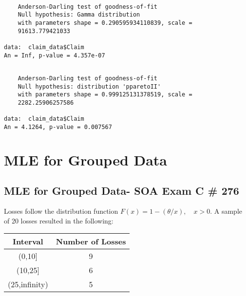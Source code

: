 \documentclass[]{book}
\newenvironment{Shaded}{\begin{snugshade}}{\end{snugshade}}
\newcommand{\KeywordTok}[1]{\textcolor[rgb]{0.13,0.29,0.53}{\textbf{#1}}}
\newcommand{\DataTypeTok}[1]{\textcolor[rgb]{0.13,0.29,0.53}{#1}}
\newcommand{\DecValTok}[1]{\textcolor[rgb]{0.00,0.00,0.81}{#1}}
\newcommand{\StringTok}[1]{\textcolor[rgb]{0.31,0.60,0.02}{#1}}
\newcommand{\OperatorTok}[1]{\textcolor[rgb]{0.81,0.36,0.00}{\textbf{#1}}}
\newcommand{\NormalTok}[1]{#1}
\theoremstyle{definition}
\theoremstyle{definition}
\theoremstyle{definition}
\theoremstyle{remark}
\begin{document}
\begin{verbatim}

    Anderson-Darling test of goodness-of-fit
    Null hypothesis: Gamma distribution
    with parameters shape = 0.290595934110839, scale =
    91613.779421033

data:  claim_data$Claim
An = Inf, p-value = 4.357e-07
\end{verbatim}

\begin{Shaded}
\end{Shaded}

\begin{verbatim}

    Anderson-Darling test of goodness-of-fit
    Null hypothesis: distribution 'pparetoII'
    with parameters shape = 0.999125131378519, scale =
    2282.25906257586

data:  claim_data$Claim
An = 4.1264, p-value = 0.007567
\end{verbatim}

\section{MLE for Grouped Data}\label{mle-for-grouped-data}

\subsection{MLE for Grouped Data- SOA Exam C \#
276}\label{mle-for-grouped-data--soa-exam-c-276}

Losses follow the distribution function \(F(x)=1-(\theta/x),\quad x>0\).
A sample of 20 losses resulted in the following:

\begin{longtable}[]{@{}cc@{}}
\toprule
Interval & Number of Losses\tabularnewline
\midrule
\endhead
(0,10{]} & 9\tabularnewline
(10,25{]} & 6\tabularnewline
(25,infinity) & 5\tabularnewline
\bottomrule
\end{longtable}
\end{document}
